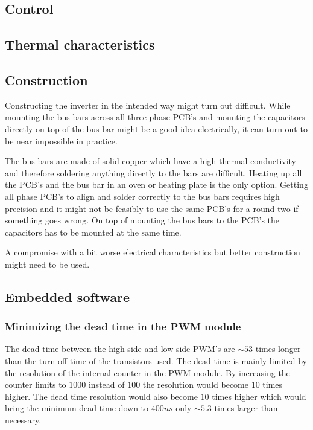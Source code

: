 \subsection{Control}

\subsection{Thermal characteristics}


\subsection{Construction}
Constructing the inverter in the intended way might turn out difficult. While mounting the bus bars across all three phase PCB's and mounting the capacitors directly on top of the bus bar might be a good idea electrically, it can turn out to be near impossible in practice.

The bus bars are made of solid copper which have a high thermal conductivity and therefore soldering anything directly to the bars are difficult. Heating up all the PCB's and the bus bar in an oven or heating plate is the only option. 
Getting all phase PCB's to align and solder correctly to the bus bars requires high precision and it might not be feasibly to use the same PCB's for a round two if something goes wrong.
On top of mounting the bus bars to the PCB's the capacitors has to be mounted at the same time. 

A compromise with a bit worse electrical characteristics but better construction might need to be used.

\subsection{Embedded software}

\subsubsection{Minimizing the dead time in the PWM module}

The dead time between the high-side and low-side PWM's are $\sim 53$ times longer than the turn off time of the transistors used. The dead time is mainly limited by the resolution of the internal counter in the PWM module. By increasing the counter limits to $1000$ instead of $100$ the resolution would become $10$ times higher. The dead time resolution would also become $10$ times higher which would bring the minimum dead time down to $400ns$ only $\sim 5.3$ times larger than necessary.


